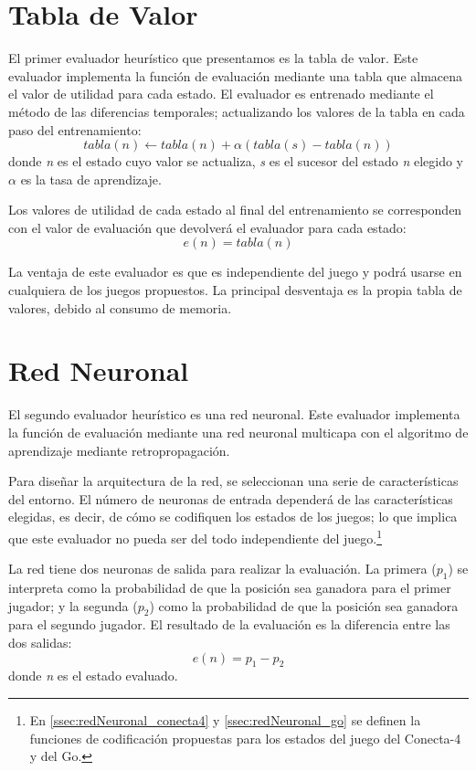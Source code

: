 \section{Tabla de Valor}
\label{sec:tabla_valor}
El primer evaluador heurístico que presentamos es la tabla de valor.
Este evaluador implementa la función de evaluación mediante una tabla que almacena el valor de utilidad para cada estado.
El evaluador es entrenado mediante el método de las diferencias temporales; actualizando los valores de la tabla en cada paso del entrenamiento:
\begin{displaymath}
tabla(n) \leftarrow tabla(n) + \alpha(tabla(s) - tabla(n))
\end{displaymath}
donde \textit{n} es el estado cuyo valor se actualiza, \textit{s} es el sucesor del estado \textit{n} elegido y $\alpha$ es la tasa de aprendizaje.

Los valores de utilidad de cada estado al final del entrenamiento se corresponden con el valor de evaluación que devolverá el evaluador para cada estado:
\begin{displaymath}
e(n) = tabla(n)
\end{displaymath}

La ventaja de este evaluador es que es independiente del juego y podrá usarse en cualquiera de los juegos propuestos.
La principal desventaja es la propia tabla de valores, debido al consumo de memoria.

\section{Red Neuronal}
\label{sec:red_neuronal}
El segundo evaluador heurístico es una red neuronal.
Este evaluador implementa la función de evaluación mediante una red neuronal multicapa con el algoritmo de aprendizaje mediante retropropagación.

Para diseñar la arquitectura de la red, se seleccionan una serie de características del entorno.
El número de neuronas de entrada dependerá de las características elegidas, es decir, de cómo se codifiquen los estados de los juegos; lo que implica que este evaluador no pueda ser del todo independiente del juego.\footnote{En \ref{ssec:redNeuronal_conecta4} y \ref{ssec:redNeuronal_go} se definen la funciones de codificación propuestas para los estados del juego del Conecta-4 y del Go.}

La red tiene dos neuronas de salida para realizar la evaluación.
La primera ($p_1$) se interpreta como la probabilidad de que la posición sea ganadora para el primer jugador; y la segunda ($p_2$) como la probabilidad de que la posición sea ganadora para el segundo jugador.
El resultado de la evaluación es la diferencia entre las dos salidas:
\begin{displaymath}
e(n) = p_1 - p_2
\end{displaymath}
donde \textit{n} es el estado evaluado.


